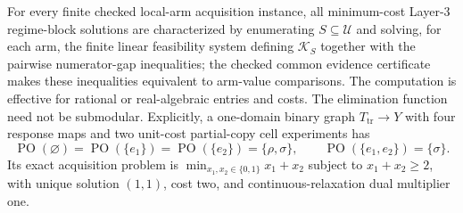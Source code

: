 For every finite checked local-arm acquisition instance, all minimum-cost Layer-3 regime-block solutions are characterized by enumerating \(S\subseteq\mathcal U\) and solving, for each arm, the finite linear feasibility system defining \(\mathcal K_S\) together with the pairwise numerator-gap inequalities; the checked common evidence certificate makes these inequalities equivalent to arm-value comparisons.  The computation is effective for rational or real-algebraic entries and costs.  The elimination function need not be submodular.  Explicitly, a one-domain binary graph \(T_{\mathrm{tr}}\to Y\) with four response maps and two unit-cost partial-copy cell experiments has
\[
\operatorname{PO}(\varnothing)=\operatorname{PO}(\{e_1\})=
\operatorname{PO}(\{e_2\})=\{\rho,\sigma\},\qquad
\operatorname{PO}(\{e_1,e_2\})=\{\sigma\}.
\]
Its exact acquisition problem is \(\min_{x_1,x_2\in\{0,1\}}x_1+x_2\) subject to \(x_1+x_2\ge2\), with unique solution \((1,1)\), cost two, and continuous-relaxation dual multiplier one.